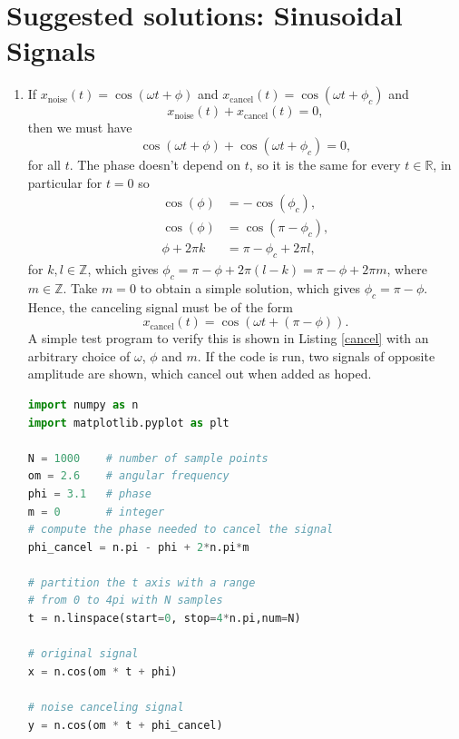 \newpage
\section{Suggested solutions: Sinusoidal Signals}
\begin{enumerate}
\item If $x_{\text{noise}}(t)=\cos(\omega t+\phi)$ and $x_{\text{cancel}}(t)=\cos(\omega t+\phi_{c})$ and
$$x_{\text{noise}}(t)+x_{\text{cancel}}(t)=0,$$
then we must have
$$\cos(\omega t+\phi)+\cos(\omega t+\phi_{c})=0,$$
for all $t$. The phase doesn't depend on $t$, so it is the same for every $t\in\mathbb{R}$, in particular for $t=0$ so
\begin{align*}
    \cos(\phi)&=-\cos(\phi_{c}), \\
    \cos(\phi)&=\cos(\pi -\phi_{c}), \\
    \phi+2\pi k&=\pi-\phi_{c}+2\pi l,
\end{align*}
for $k,l\in\mathbb{Z}$, which gives $\phi_{c}=\pi-\phi+2\pi(l-k)=\pi-\phi+2\pi m$, where $m\in\mathbb{Z}$. Take $m=0$ to obtain a simple solution, which gives $\phi_{c}=\pi -\phi$.
Hence, the canceling signal must be of the form
$$x_{\text{cancel}}(t)=\cos(\omega t+(\pi-\phi)).$$
A simple test program to verify this is shown in Listing \ref{cancel} with an arbitrary choice of $\omega$, $\phi$ and $m$. If the code is run, two signals of opposite amplitude are shown, which cancel out when added as hoped. 

\begin{lstlisting}[language=Python, caption=Noise canceling signal,label=cancel]
import numpy as n
import matplotlib.pyplot as plt

N = 1000    # number of sample points
om = 2.6    # angular frequency
phi = 3.1   # phase
m = 0       # integer
# compute the phase needed to cancel the signal
phi_cancel = n.pi - phi + 2*n.pi*m    

# partition the t axis with a range 
# from 0 to 4pi with N samples
t = n.linspace(start=0, stop=4*n.pi,num=N)

# original signal
x = n.cos(om * t + phi)

# noise canceling signal
y = n.cos(om * t + phi_cancel)


\end{lstlisting}
\end{enumerate}
